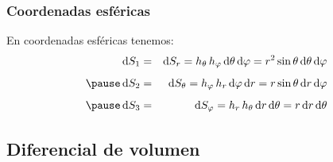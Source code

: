 \documentclass[12pt]{beamer}
\begin{document}
\begin{frame}
\frametitle{Coordenadas esféricas}
En coordenadas esféricas tenemos:
\pause
\begin{eqnarray*}
\dd{S_{1}} &=& \dd{S_{r}} = h_{\theta} \, h_{\varphi} \dd{\theta} \dd{\varphi} = r^{2} \sin \theta \dd{\theta} \dd{\varphi} \\[0.5em] \pause
\dd{S_{2}} &=& \dd{S_{\theta}} = h_{\varphi} \, h_{r} \dd{\varphi} \dd{r} = r \sin \theta \dd{r} \dd{\varphi} \\[0.5em] \pause
\dd{S_{3}} &=& \dd{S_{\varphi}} = h_{r} \, h_{\theta} \dd{r} \dd{\theta} = r \dd{r} \dd{\theta}
\end{eqnarray*}
\end{frame}

\subsection{Diferencial de volumen}
\end{document}
